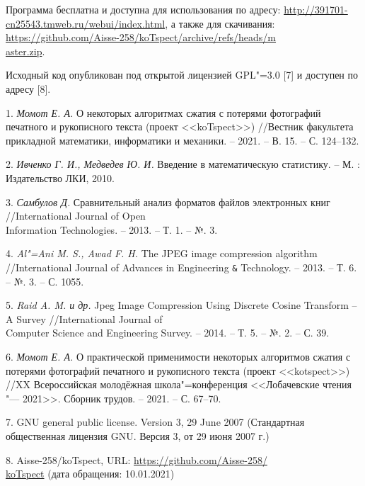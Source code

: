Программа бесплатна и доступна для использования по адресу: \href{http://391701-cn25543.tmweb.ru/webui/index.html}{http://391701-cn25543.tmweb.ru/webui/index.html},
а также для скачивания:\\\href{https://github.com/Aisse-258/koTspect/archive/refs/heads/master.zip}{https://github.com/Aisse-258/koTspect/archive/refs/heads/m\\aster.zip}.

Исходный код опубликован под открытой лицензией GPL"=3.0 [7] и доступен по адресу [8].





\litlist

1. {\it Момот Е. А.} О некоторых алгоритмах сжатия с потерями фотографий печатного и рукописного текста (проект <<koTspect>>) //Вестник факультета прикладной математики, информатики и механики. -- 2021. -- В. 15. -- С. 124--132.

2. {\it Ивченко Г. И., Медведев Ю. И.} Введение в математическую статистику. -- М. : Издательство ЛКИ, 2010.

3. {\it Самбулов Д.} Сравнительный анализ форматов файлов электронных книг //International Journal of Open\\Information Technologies. -- 2013. -- Т. 1. -- №. 3.

4. {\it Al"=Ani M. S., Awad F. H.} The JPEG image compression algorithm //International Journal of Advances in Engineering \verb|&| Technology. -- 2013. -- Т. 6. -- №. 3. -- С. 1055.

5. {\it Raid A. M. и др.} Jpeg Image Compression Using Discrete Cosine Transform -- A Survey //International Journal of\\Computer Science and Engineering Survey. -- 2014. -- Т. 5. -- №. 2. -- С. 39.

6. {\it Момот Е. А.} О практической применимости некоторых алгоритмов сжатия с потерями фотографий печатного и рукописного текста (проект <<kotspect>>) //XX Всероссийская молодёжная школа"=конференция <<Лобачевские чтения "--- 2021>>. Сборник трудов. -- 2021. -- С. 67--70.

7. GNU general public license. Version 3, 29 June 2007 (Стандартная общественная лицензия GNU. Версия 3, от 29 июня 2007 г.)

8. Aisse-258/koTspect, URL: \href{https://github.com/Aisse-258/koTspect}{https://github.com/Aisse-258/\\koTspect} (дата обращения: 10.01.2021)

